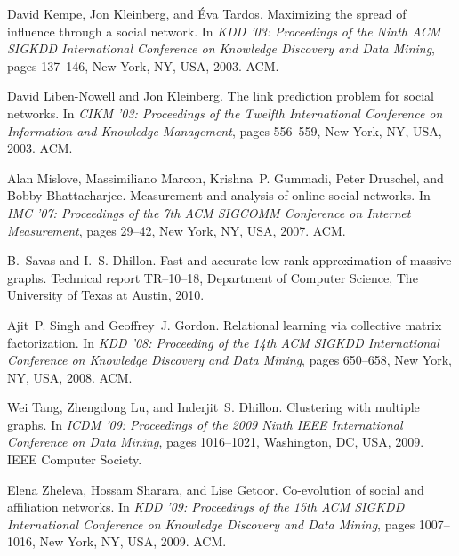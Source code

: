 \documentclass{sig-alternate}
\begin{document}
\begin{thebibliography}{10}
David Kempe, Jon Kleinberg, and \'{E}va Tardos.
\newblock Maximizing the spread of influence through a social network.
\newblock In {\em KDD '03: Proceedings of the Ninth ACM SIGKDD International
  Conference on Knowledge Discovery and Data Mining}, pages 137--146, New York,
  NY, USA, 2003. ACM.
\vfill\eject

David Liben-Nowell and Jon Kleinberg.
\newblock The link prediction problem for social networks.
\newblock In {\em CIKM '03: Proceedings of the Twelfth International Conference
  on Information and Knowledge Management}, pages 556--559, New York, NY, USA,
  2003. ACM.

Alan Mislove, Massimiliano Marcon, Krishna~P. Gummadi, Peter Druschel, and
  Bobby Bhattacharjee.
\newblock Measurement and analysis of online social networks.
\newblock In {\em IMC '07: Proceedings of the 7th ACM SIGCOMM Conference on
  Internet Measurement}, pages 29--42, New York, NY, USA, 2007. ACM.

B.~Savas and I.~S. Dhillon.
\newblock Fast and accurate low rank approximation of massive graphs.
\newblock Technical report TR--10--18, Department of Computer Science, The
  University of Texas at Austin, 2010.

Ajit~P. Singh and Geoffrey~J. Gordon.
\newblock Relational learning via collective matrix factorization.
\newblock In {\em KDD '08: Proceeding of the 14th ACM SIGKDD International
  Conference on Knowledge Discovery and Data Mining}, pages 650--658, New York,
  NY, USA, 2008. ACM.

Wei Tang, Zhengdong Lu, and Inderjit~S. Dhillon.
\newblock Clustering with multiple graphs.
\newblock In {\em ICDM '09: Proceedings of the 2009 Ninth IEEE International
  Conference on Data Mining}, pages 1016--1021, Washington, DC, USA, 2009. IEEE
  Computer Society.

Elena Zheleva, Hossam Sharara, and Lise Getoor.
\newblock Co-evolution of social and affiliation networks.
\newblock In {\em KDD '09: Proceedings of the 15th ACM SIGKDD International
  Conference on Knowledge Discovery and Data Mining}, pages 1007--1016, New
  York, NY, USA, 2009. ACM.

\end{thebibliography}
\end{document}
